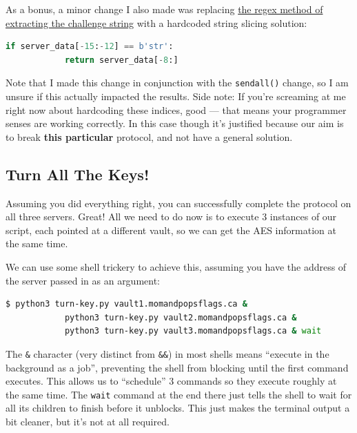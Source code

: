 \documentclass[11pt]{article}
\begin{document}
    \bigskip

    As a bonus, a minor change I also made was replacing \hyperref[lst:regex-extract]{the regex method of extracting the challenge string} with a hardcoded string slicing solution:

    \begin{lstlisting}[gobble=8,label={lst:regex-efficiency},language=Python]
        if server_data[-15:-12] == b'str':
            return server_data[-8:]
    \end{lstlisting}

    Note that I made this change in conjunction with the \verb`sendall()` change, so I am unsure if this actually impacted the results. Side note: If you're screaming at me right now about hardcoding these indices, good --- that means your programmer senses are working correctly. In this case though it's justified because our aim is to break \textbf{this particular} protocol, and not have a general solution.

    \subsection{Turn All The Keys!}\label{subsec:turn-all-the-keys}

    Assuming you did everything right, you can successfully complete the protocol on all three servers. Great! All we need to do now is to execute 3 instances of our script, each pointed at a different vault, so we can get the AES information at the same time.

    We can use some shell trickery to achieve this, assuming you have the address of the server passed in as an argument:

    \begin{lstlisting}[gobble=8,label={lst:parallel-commands},language=Bash]
        $ python3 turn-key.py vault1.momandpopsflags.ca &
            python3 turn-key.py vault2.momandpopsflags.ca &
            python3 turn-key.py vault3.momandpopsflags.ca & wait
    \end{lstlisting}

    The \verb`&` character (very distinct from \verb`&&`) in most shells means ``execute in the background as a job'', preventing the shell from blocking until the first command executes. This allows us to ``schedule'' 3 commands so they execute roughly at the same time. The \verb`wait` command at the end there just tells the shell to wait for all its children to finish before it unblocks. This just makes the terminal output a bit cleaner, but it's not at all required.
\end{document}
